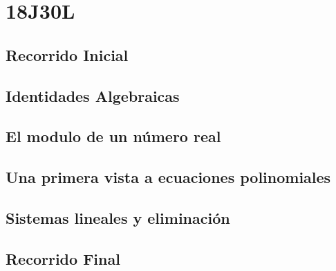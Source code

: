 \chapter{18J30L}
\section{Recorrido Inicial}

\section{Identidades Algebraicas}

\section{El modulo de un n\'{u}mero real}

\section{Una primera vista a ecuaciones polinomiales}

\section{Sistemas lineales y eliminaci\'{o}n}

\section{Recorrido Final}
